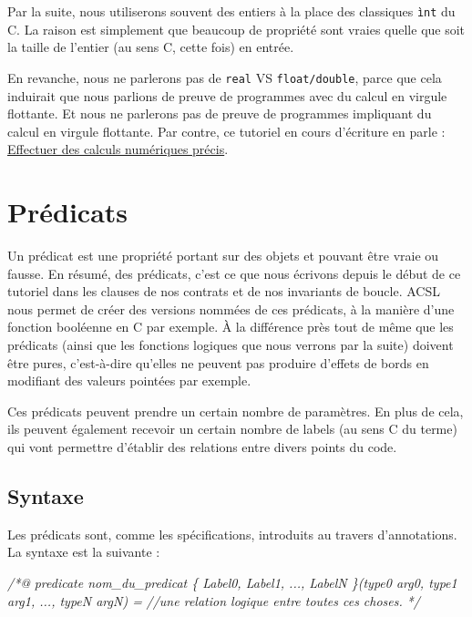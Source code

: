\documentclass[12pt,francais,]{scrbook}
\newenvironment{Shaded}{}{}
\newcommand{\CommentTok}[1]{\textcolor[rgb]{0.38,0.63,0.69}{\textit{{#1}}}}
\begin{document}
Par la suite, nous utiliserons souvent des entiers à la place des
classiques \texttt{ìnt} du C. La raison est simplement que beaucoup de
propriété sont vraies quelle que soit la taille de l'entier (au sens C,
cette fois) en entrée.

En revanche, nous ne parlerons pas de \texttt{real} VS
\texttt{float/double}, parce que cela induirait que nous parlions de
preuve de programmes avec du calcul en virgule flottante. Et nous ne
parlerons pas de preuve de programmes impliquant du calcul en virgule
flottante. Par contre, ce tutoriel en cours d'écriture en parle :
\href{https://zestedesavoir.com/forums/sujet/4157/effectuer-des-calculs-numeriques-precis/}{Effectuer
des calculs numériques précis}.

\section{Prédicats}\label{pruxe9dicats}

Un prédicat est une propriété portant sur des objets et pouvant être
vraie ou fausse. En résumé, des prédicats, c'est ce que nous écrivons
depuis le début de ce tutoriel dans les clauses de nos contrats et de
nos invariants de boucle. ACSL nous permet de créer des versions nommées
de ces prédicats, à la manière d'une fonction booléenne en C par
exemple. À la différence près tout de même que les prédicats (ainsi que
les fonctions logiques que nous verrons par la suite) doivent être
pures, c'est-à-dire qu'elles ne peuvent pas produire d'effets de bords
en modifiant des valeurs pointées par exemple.

Ces prédicats peuvent prendre un certain nombre de paramètres. En plus
de cela, ils peuvent également recevoir un certain nombre de labels (au
sens C du terme) qui vont permettre d'établir des relations entre divers
points du code.

\subsection{Syntaxe}\label{syntaxe}

Les prédicats sont, comme les spécifications, introduits au travers
d'annotations. La syntaxe est la suivante :

\begin{footnotesize}\begin{Shaded}
\begin{Highlighting}[]
\CommentTok{/*@}
\CommentTok{  predicate nom_du_predicat \{ Label0, Label1, ..., LabelN \}(type0 arg0, type1 arg1, ..., typeN argN) =}
\CommentTok{    //une relation logique entre toutes ces choses.}
\CommentTok{*/}
\end{Highlighting}
\end{Shaded}\end{footnotesize}
\end{document}
